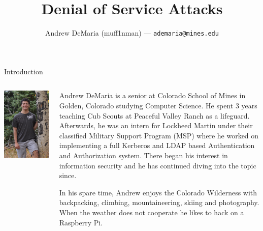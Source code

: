 \documentclass{beamer}
\title{
	Denial of Service Attacks
}
\author{
	Andrew DeMaria (muff1nman) --- \texttt{ademaria@mines.edu}
}
\begin{document}
\maketitle
\begin{frame}{Introduction}
	\begin{columns}
		\begin{column}{0.3\textwidth}
			\includegraphics[width=1\textwidth]{images/andrew.JPG}
		\end{column}
		\begin{column}{0.7\textwidth}
			Andrew DeMaria is a senior at Colorado School of Mines in Golden, Colorado
			studying Computer Science. He spent 3 years teaching Cub Scouts at Peaceful
			Valley Ranch as a lifeguard. Afterwards, he was an intern for Lockheed Martin
			under their classified Military Support Program (MSP) where he worked on
			implementing a full Kerberos and LDAP based Authentication and Authorization
			system. There began his interest in information security and he has continued
			diving into the topic since.

			In his spare time, Andrew enjoys the Colorado Wilderness with backpacking,
			climbing, mountaineering, skiing and photography. When the weather does not
			cooperate he likes to hack on a Raspberry Pi.
		\end{column}
	\end{columns}
\end{frame}
\end{document}
